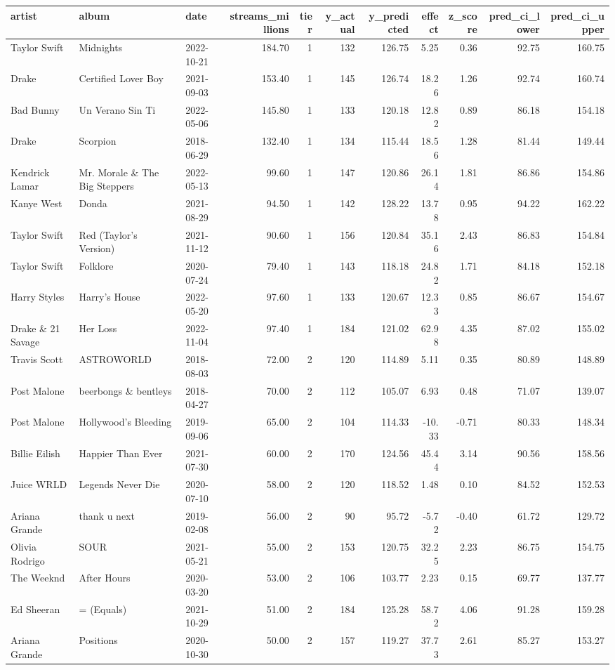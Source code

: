 \begin{tabular}{lllrrrrrrrr}
\toprule
artist & album & date & streams\_millions & tier & y\_actual & y\_predicted & effect & z\_score & pred\_ci\_lower & pred\_ci\_upper \\
\midrule
Taylor Swift & Midnights & 2022-10-21 & 184.70 & 1 & 132 & 126.75 & 5.25 & 0.36 & 92.75 & 160.75 \\
Drake & Certified Lover Boy & 2021-09-03 & 153.40 & 1 & 145 & 126.74 & 18.26 & 1.26 & 92.74 & 160.74 \\
Bad Bunny & Un Verano Sin Ti & 2022-05-06 & 145.80 & 1 & 133 & 120.18 & 12.82 & 0.89 & 86.18 & 154.18 \\
Drake & Scorpion & 2018-06-29 & 132.40 & 1 & 134 & 115.44 & 18.56 & 1.28 & 81.44 & 149.44 \\
Kendrick Lamar & Mr. Morale \& The Big Steppers & 2022-05-13 & 99.60 & 1 & 147 & 120.86 & 26.14 & 1.81 & 86.86 & 154.86 \\
Kanye West & Donda & 2021-08-29 & 94.50 & 1 & 142 & 128.22 & 13.78 & 0.95 & 94.22 & 162.22 \\
Taylor Swift & Red (Taylor's Version) & 2021-11-12 & 90.60 & 1 & 156 & 120.84 & 35.16 & 2.43 & 86.83 & 154.84 \\
Taylor Swift & Folklore & 2020-07-24 & 79.40 & 1 & 143 & 118.18 & 24.82 & 1.71 & 84.18 & 152.18 \\
Harry Styles & Harry's House & 2022-05-20 & 97.60 & 1 & 133 & 120.67 & 12.33 & 0.85 & 86.67 & 154.67 \\
Drake \& 21 Savage & Her Loss & 2022-11-04 & 97.40 & 1 & 184 & 121.02 & 62.98 & 4.35 & 87.02 & 155.02 \\
Travis Scott & ASTROWORLD & 2018-08-03 & 72.00 & 2 & 120 & 114.89 & 5.11 & 0.35 & 80.89 & 148.89 \\
Post Malone & beerbongs \& bentleys & 2018-04-27 & 70.00 & 2 & 112 & 105.07 & 6.93 & 0.48 & 71.07 & 139.07 \\
Post Malone & Hollywood's Bleeding & 2019-09-06 & 65.00 & 2 & 104 & 114.33 & -10.33 & -0.71 & 80.33 & 148.34 \\
Billie Eilish & Happier Than Ever & 2021-07-30 & 60.00 & 2 & 170 & 124.56 & 45.44 & 3.14 & 90.56 & 158.56 \\
Juice WRLD & Legends Never Die & 2020-07-10 & 58.00 & 2 & 120 & 118.52 & 1.48 & 0.10 & 84.52 & 152.53 \\
Ariana Grande & thank u next & 2019-02-08 & 56.00 & 2 & 90 & 95.72 & -5.72 & -0.40 & 61.72 & 129.72 \\
Olivia Rodrigo & SOUR & 2021-05-21 & 55.00 & 2 & 153 & 120.75 & 32.25 & 2.23 & 86.75 & 154.75 \\
The Weeknd & After Hours & 2020-03-20 & 53.00 & 2 & 106 & 103.77 & 2.23 & 0.15 & 69.77 & 137.77 \\
Ed Sheeran & = (Equals) & 2021-10-29 & 51.00 & 2 & 184 & 125.28 & 58.72 & 4.06 & 91.28 & 159.28 \\
Ariana Grande & Positions & 2020-10-30 & 50.00 & 2 & 157 & 119.27 & 37.73 & 2.61 & 85.27 & 153.27 \\
\bottomrule
\end{tabular}
